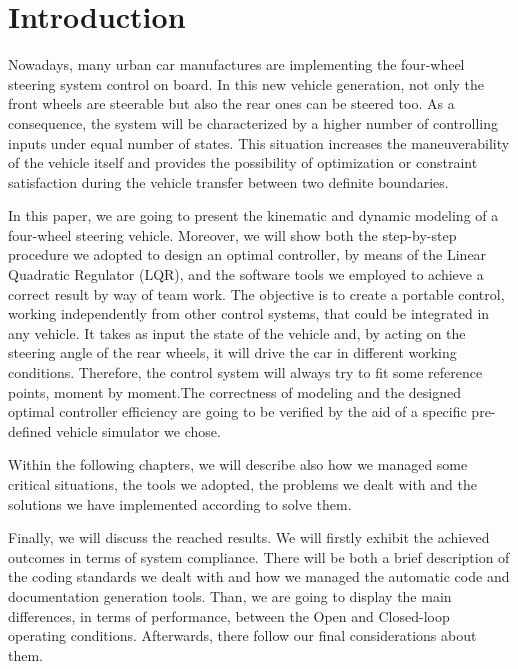 
\chapter{Introduction}
	Nowadays, many urban car manufactures are implementing the four-wheel steering system control on board. In this new vehicle generation, not only the front wheels are steerable but also the rear ones can be steered too. As a consequence, the system will be characterized by a higher number of controlling inputs under equal number of states. This situation increases the maneuverability of the vehicle itself and provides the possibility of optimization or constraint satisfaction during the vehicle transfer between two definite boundaries.
	
	In this paper, we are going to present the kinematic and dynamic modeling of a four-wheel steering vehicle. Moreover, we will show both the step-by-step procedure we adopted to design an optimal controller, by means of the Linear Quadratic Regulator (LQR), and the software tools we employed to achieve a correct result by way of team work. The objective is to create a portable control, working independently from other control systems, that could be integrated in any vehicle. It takes as input the state of the vehicle and, by acting on the steering angle of the rear wheels, it will drive the car in different working conditions. Therefore, the control system will always try to fit some reference points, moment by moment.The correctness of modeling and the designed optimal controller efficiency are going to be verified by the aid of a specific pre-defined vehicle simulator we chose.
	
	Within the following chapters, we will describe also how we managed some critical situations, the tools we adopted, the problems we dealt with and the solutions we have implemented according to solve them. 
	
	Finally, we will discuss the reached results. We will firstly exhibit the achieved outcomes in terms of system compliance. There will be both a brief description of the coding standards we dealt with and how we managed the automatic code and documentation generation tools. Than, we are going to display the main differences, in terms of performance, between the Open and Closed-loop operating conditions. Afterwards, there follow our final considerations about them. 
